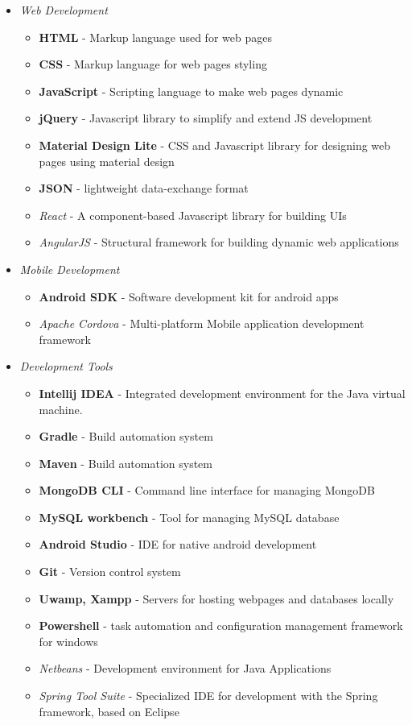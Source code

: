\documentclass[12pt]{article}
\begin{document}
\begin{itemize}[leftmargin=20pt]
	\item \textit{Web Development}
	\begin{itemize}
		\item \textbf{HTML} - Markup language used for web pages
		\item \textbf{CSS} - Markup language for web pages styling
		\item \textbf{JavaScript} - Scripting language to make web pages dynamic
		\item \textbf{jQuery} - Javascript library to simplify and extend JS development
		\item \textbf{Material Design Lite} - CSS and Javascript library for designing web pages using material design
		\item \textbf{JSON} - lightweight data-exchange format
		\item \textit{React} - A component-based Javascript library for building UIs
		\item \textit{AngularJS} - Structural framework for building dynamic web applications
		
	\end{itemize}

	\item \textit{Mobile Development}
	\begin{itemize}
		\item \textbf{Android SDK} - Software development kit for android apps
		\item \textit{Apache Cordova} - Multi-platform Mobile application development framework
	\end{itemize}
	\item \textit{Development Tools}
	\begin{itemize}
		\item \textbf{Intellij IDEA} - Integrated development environment for the Java virtual machine.
		\item \textbf{Gradle} - Build automation system
		\item \textbf{Maven} - Build automation system
		\item \textbf{MongoDB CLI} - Command line interface for managing MongoDB 
		\item \textbf{MySQL workbench} - Tool for managing MySQL database
		\item \textbf{Android Studio} - IDE for native android development
		\item \textbf{Git} - Version control system
		\item \textbf{Uwamp, Xampp} - Servers for hosting webpages and databases locally
		\item \textbf{Powershell} - task automation and configuration management framework for windows
		\item \textit{Netbeans} - Development environment for Java Applications
		\item \textit{Spring Tool Suite} - Specialized IDE for development with the Spring framework, based on Eclipse
	\end{itemize}
	
	
	
	 
\end{itemize}
\end{document}
